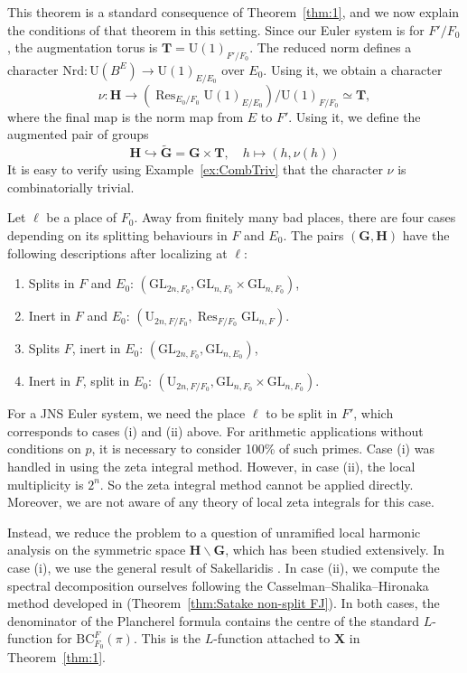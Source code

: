\documentclass{amsart}
\theoremstyle{definition}
\theoremstyle{remark}
\newcommand{\1}{\mathbf{1}}
\newcommand{\GL}{\mathrm{GL}}
\newcommand{\mb}[1]{\mathbf{#1}}
\newcommand{\U}{\mathrm{U}}
\DeclareMathOperator{\Res}{Res}
\theoremstyle{definition}
\newcommand{\bG}{\mathbf{G}}
\begin{document}
This theorem is a standard consequence of Theorem~\ref{thm:1}, and we now explain the conditions of that theorem in this setting. Since our Euler system is for $F'/F_0$, the augmentation torus is $\mb{T}=\U(1)_{F'/F_0}$. The reduced norm defines a character $\mathrm{Nrd}:\U(B^E)\to\U(1)_{E/E_0}$ over $E_0$. Using it, we obtain a character
\[
    \nu:\mb{H}\to(\Res_{E_0/F_0}\U(1)_{E/E_0})/\U(1)_{F/F_0}\simeq\mb{T},
\]
where the final map is the norm map from $E$ to $F'$. Using it, we define the augmented pair of groups
\[
    \mb{H}\hookrightarrow\widetilde{\mb{G}}=\bG\times\mb{T},\quad h\mapsto(h,\nu(h))
\]
It is easy to verify using Example~\ref{ex:CombTriv} that the character $\nu$ is combinatorially trivial. 

Let $\ell$ be a place of $F_0$. Away from finitely many bad places, there are four cases depending on its splitting behaviours in $F$ and $E_0$. The pairs $(\mb{G},\mb{H})$ have the following descriptions after localizing at $\ell$:
\begin{enumerate}[label=(\roman*)]
    \item Splits in $F$ and $E_0$: $(\GL_{2n,F_0}, \GL_{n,F_0}\times\GL_{n,F_0})$,
    \item Inert in $F$ and $E_0$: $(\U_{2n,F/F_0}, \Res_{F/F_0}\GL_{n,F})$.
    \item Splits $F$, inert in $E_0$: $(\GL_{2n,F_0}, \GL_{n,E_0})$,
    \item Inert in $F$, split in $E_0$: $(\U_{2n,F/F_0}, \GL_{n,F_0}\times\GL_{n,F_0})$.
\end{enumerate}

For a JNS Euler system, we need the place $\ell$ to be split in $F'$, which corresponds to cases (i) and (ii) above. For arithmetic applications without conditions on $p$, it is necessary to consider 100\% of such primes. Case (i) was handled in \cite{GrahamShah} using the zeta integral method. However, in case (ii), the local multiplicity is $2^n$. So the zeta integral method cannot be applied directly. Moreover, we are not aware of any theory of local zeta integrals for this case.

Instead, we reduce the problem to a question of unramified local harmonic analysis on the symmetric space $\mb{H}\backslash\mb{G}$, which has been studied extensively. In case (i), we use the general result of Sakellaridis \cite{SakSpherical}. In case (ii), we compute the spectral decomposition ourselves following the Casselman--Shalika--Hironaka method developed in \cite{Hir10,Off04} (Theorem~\ref{thm:Satake non-split FJ}). In both cases, the denominator of the Plancherel formula contains the centre of the standard $L$-function for $\mathrm{BC}_{F_0}^F(\pi)$. This is the $L$-function attached to $\mb{X}$ in Theorem~\ref{thm:1}.
\end{document}
